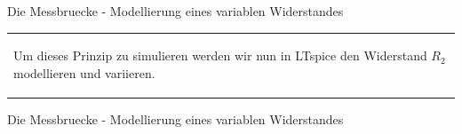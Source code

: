 \begin{frame}[t]{Die Messbruecke - Modellierung eines variablen Widerstandes}
\begin{spacing}{0.9}
\begin{tiny}
\begin{table}[h!]
\begin{tabular}{p{10cm}}
\begin{minipage}{\textwidth}
\begin{figure}
            \end{figure}
            Um dieses Prinzip zu simulieren werden wir nun in LTspice den Widerstand $R_2$ modellieren und variieren.
        \end{minipage} 
        \\
      \end{tabular}

    \end{table}
     
    \end{tiny} \end{spacing}

\end{frame}

\begin{frame}[t]{Die Messbruecke - Modellierung eines variablen Widerstandes} 
    

\end{frame}
